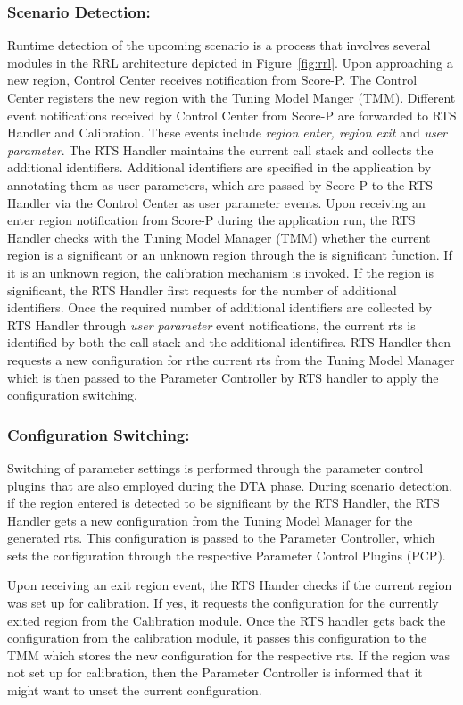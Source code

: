\subsubsection{Scenario Detection:} Runtime detection of the upcoming scenario is a process that involves several modules in
the RRL architecture depicted in Figure~\ref{fig:rrl}. Upon approaching a new region, Control Center receives notification from Score-P. The Control Center registers the new region with the Tuning Model Manger (TMM). Different event notifications received by Control Center from Score-P are forwarded to RTS Handler and Calibration. These events include \textit{region enter, region exit} and \textit{user parameter}. The RTS Handler maintains the current call stack and collects the additional identifiers. Additional identifiers are specified in the application by annotating them as user parameters, which are passed by Score-P to the RTS Handler via the Control Center as user parameter events. Upon receiving an enter region notification from Score-P during the application run,
the RTS Handler checks with the Tuning Model Manager (TMM) whether the current region is a significant or an unknown region through the is significant function. If it is an unknown region, the calibration mechanism is invoked.
If the region is significant, the RTS Handler first requests for the number of additional identifiers. Once the required number of additional identifiers are collected by RTS Handler through \textit{user parameter} event notifications, the current rts is identified by both the call stack and the additional identifires. RTS Handler then requests a new configuration for rthe current rts from the Tuning Model Manager which is
then passed to the Parameter Controller by RTS handler to apply the configuration switching. 
\subsubsection{Configuration Switching:} Switching of parameter settings is performed through the parameter control plugins that are also employed during the DTA phase.
During scenario detection, if the region entered is detected to be significant by the RTS Handler, the RTS Handler gets a new configuration from the Tuning Model Manager for
the generated rts. This configuration is passed to the Parameter
Controller, which sets the configuration through the respective Parameter Control Plugins (PCP).

Upon receiving an exit region event, the RTS Hander checks if the current region was set up for calibration. If yes, it requests the configuration for the currently exited region from the
Calibration module. Once the RTS handler gets back the configuration from the calibration module, it passes this configuration to the TMM which stores the new configuration for the respective rts. If the region was not set up for calibration, then the Parameter Controller is informed that it might want to unset the current configuration. 

